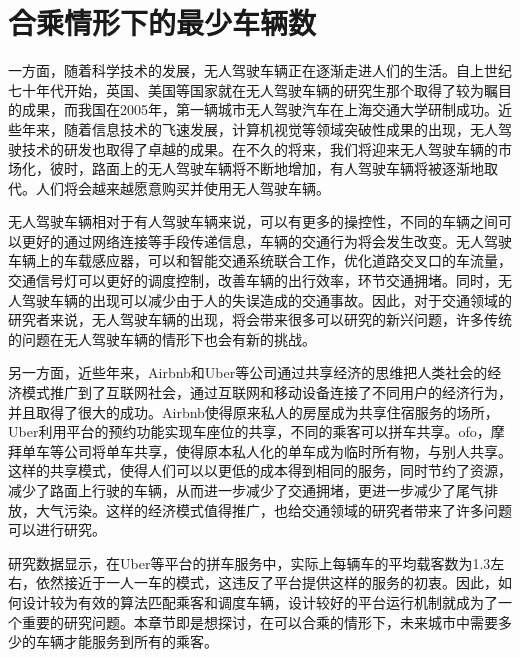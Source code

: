 \chapter{合乘情形下的最少车辆数}
\label{chap:share}
一方面，随着科学技术的发展，无人驾驶车辆正在逐渐走进人们的生活。自上世纪七十年代开始，英国、美国等国家就在无人驾驶车辆的研究生那个取得了较为瞩目的成果，而我国在2005年，第一辆城市无人驾驶汽车在上海交通大学研制成功。近些年来，随着信息技术的飞速发展，计算机视觉等领域突破性成果的出现，无人驾驶技术的研发也取得了卓越的成果。在不久的将来，我们将迎来无人驾驶车辆的市场化，彼时，路面上的无人驾驶车辆将不断地增加，有人驾驶车辆将被逐渐地取代。人们将会越来越愿意购买并使用无人驾驶车辆。
\par
无人驾驶车辆相对于有人驾驶车辆来说，可以有更多的操控性，不同的车辆之间可以更好的通过网络连接等手段传递信息，车辆的交通行为将会发生改变。无人驾驶车辆上的车载感应器，可以和智能交通系统联合工作，优化道路交叉口的车流量，交通信号灯可以更好的调度控制，改善车辆的出行效率，环节交通拥堵。同时，无人驾驶车辆的出现可以减少由于人的失误造成的交通事故。因此，对于交通领域的研究者来说，无人驾驶车辆的出现，将会带来很多可以研究的新兴问题，许多传统的问题在无人驾驶车辆的情形下也会有新的挑战。
\par
另一方面，近些年来，Airbnb和Uber等公司通过共享经济的思维把人类社会的经济模式推广到了互联网社会，通过互联网和移动设备连接了不同用户的经济行为，并且取得了很大的成功。Airbnb使得原来私人的房屋成为共享住宿服务的场所，Uber利用平台的预约功能实现车座位的共享，不同的乘客可以拼车共享。ofo，摩拜单车等公司将单车共享，使得原本私人化的单车成为临时所有物，与别人共享。这样的共享模式，使得人们可以以更低的成本得到相同的服务，同时节约了资源，减少了路面上行驶的车辆，从而进一步减少了交通拥堵，更进一步减少了尾气排放，大气污染。这样的经济模式值得推广，也给交通领域的研究者带来了许多问题可以进行研究。
\par
研究数据显示，在Uber等平台的拼车服务中，实际上每辆车的平均载客数为1.3左右，依然接近于一人一车的模式，这违反了平台提供这样的服务的初衷。因此，如何设计较为有效的算法匹配乘客和调度车辆，设计较好的平台运行机制就成为了一个重要的研究问题。本章节即是想探讨，在可以合乘的情形下，未来城市中需要多少的车辆才能服务到所有的乘客。


